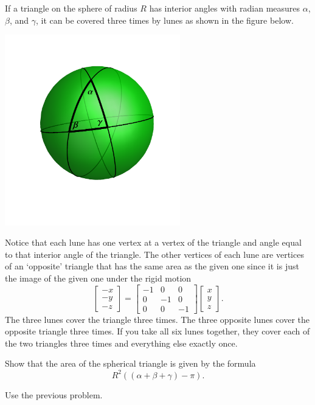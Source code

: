 \documentclass[newpage,hints,handout]{ximera}
\begin{document}
If a triangle on the sphere of radius $R$ has interior angles with radian
measures $\alpha$, $\beta$, and $\gamma$, it can be covered three times by
lunes as shown in the figure below.%
\begin{image}
\includegraphics[width=3in]{W13_4.png}%
\end{image}
Notice that each lune has one vertex at a vertex of the triangle and angle
equal to that interior angle of the triangle. The other vertices of each lune
are vertices of an `opposite' triangle that has the same area as the given one
since it is just the image of the given one under the rigid motion%
\[
\begin{bmatrix}-x\\-y\\-z\end{bmatrix}=
\begin{bmatrix}
-1 & 0 & 0\\
0 & -1 & 0\\
0 & 0 & -1
\end{bmatrix}
\begin{bmatrix}x\\y\\z\end{bmatrix}.
\]
The three lunes cover the triangle three times. The three opposite
lunes cover the opposite triangle three times. If you take all six
lunes together, they cover each of the two triangles three times and
everything else exactly once.

\begin{problem}
Show that the area of the spherical triangle is given by the
formula%
\[
R^{2}\left(  \left(  \alpha+\beta+\gamma\right)  -\pi\right).
\]
\begin{hint}
Use the previous problem.
\end{hint}
\end{problem}
\end{document}
